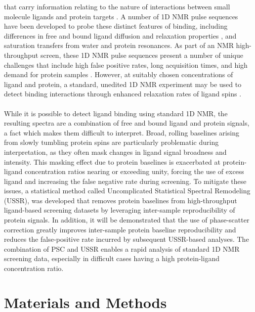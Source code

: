 \begin{doublespace}
that carry information relating to the nature of interactions between small
molecule ligands and protein targets \cite{lepre:chemrev2004}. A number of
1D \hnmr{} NMR pulse sequences have been developed to probe these distinct
features of binding, including differences in free and bound ligand diffusion
and relaxation properties \cite{hajduk:jacs1997}, and saturation transfers
from water \cite{dalvit:jbnmr2000} and protein \cite{mayer:jacs2001}
resonances. As part of an NMR high-throughput screen, these 1D \hnmr{} NMR
pulse sequences present a number of unique challenges that include high false
positive rates, long acquisition times, and high demand for protein samples
\cite{lepre:menz2011,harner:jbnmr2013}. However, at suitably chosen
concentrations of ligand and protein, a standard, unedited 1D \hnmr{} NMR
experiment may be used to detect binding interactions through enhanced
relaxation rates of ligand spins
\cite{mercier:jacs2006,powers:ddt2008,mercier:cchts2009}.
\\\\
While it is possible to detect ligand binding using standard 1D \hnmr{} NMR,
the resulting spectra are a combination of free and bound ligand and protein
signals, a fact which makes them difficult to interpret. Broad, rolling
baselines arising from slowly tumbling protein spins are particularly
problematic during interpretation, as they often mask changes in ligand signal
broadness and intensity. This masking effect due to protein baselines is
exacerbated at protein-ligand concentration ratios nearing or exceeding unity,
forcing the use of excess ligand and increasing the false negative rate during
screening. To mitigate these issues, a statistical method called Uncomplicated
Statistical Spectral Remodeling (USSR), was developed that removes protein
baselines from high-throughput ligand-based screening datasets by leveraging
inter-sample reproducibility of protein signals. In addition, it will be
demonstrated that the use of phase-scatter correction greatly improves
inter-sample protein baseline reproducibility and reduces the false-positive
rate incurred by subsequent USSR-based analyses. The combination of PSC and
USSR enables a rapid analysis of standard 1D \hnmr{} NMR screening data,
especially in difficult cases having a high protein-ligand concentration ratio.
\end{doublespace}

\section{Materials and Methods}

